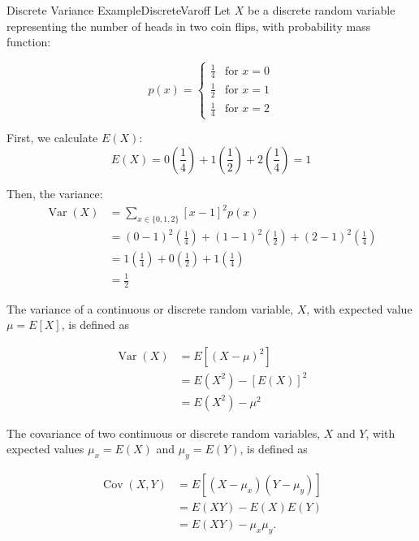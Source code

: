 \begin{ocg}{Discrete Variance Example}{DiscreteVar}{off}
    Let \( X \) be a discrete random variable representing the number of heads in two coin flips, with probability mass function:
    
    \[ p(x) = \begin{cases} 
    \frac{1}{4} & \text{for } x = 0 \\
    \frac{1}{2} & \text{for } x = 1 \\
    \frac{1}{4} & \text{for } x = 2
    \end{cases} \]
    
    First, we calculate \( E(X) \):
    \[ E(X) = 0(\frac{1}{4}) + 1(\frac{1}{2}) + 2(\frac{1}{4}) = 1 \]
    
    Then, the variance:
    \[ \begin{aligned}
    \operatorname{Var}(X) &= \sum_{x \in \{0,1,2\}} [x-1]^2 p(x) \\
    &= (0-1)^2(\frac{1}{4}) + (1-1)^2(\frac{1}{2}) + (2-1)^2(\frac{1}{4}) \\
    &= 1(\frac{1}{4}) + 0(\frac{1}{2}) + 1(\frac{1}{4}) \\
    &= \frac{1}{2}
    \end{aligned} \]
\end{ocg}

\begin{definition}[Variance with $\mu=E(X)$ ]
    The variance of a continuous or discrete random variable, $X$, with expected value $\mu=E[X]$, is defined as

    $$
    \begin{aligned}
    \operatorname{Var}(X) & =E\left[(X-\mu)^{2}\right] \\
    & =E\left(X^{2}\right)-[E(X)]^{2} \\
    & =E\left(X^{2}\right)-\mu^{2}
    \end{aligned}
    $$
\end{definition}

\begin{definition}[Covariance]
    The covariance of two continuous or discrete random variables, $X$ and $Y$, with expected values $\mu_{x}=E(X)$ and $\mu_{y}=E(Y)$, is defined as

    $$
    \begin{aligned}
    \operatorname{Cov}(X, Y) & =E\left[\left(X-\mu_{x}\right)\left(Y-\mu_{y}\right)\right] \\
    & =E(X Y)-E(X) E(Y) \\
    & =E(X Y)-\mu_{x} \mu_{y} .
    \end{aligned}
    $$
\end{definition}

